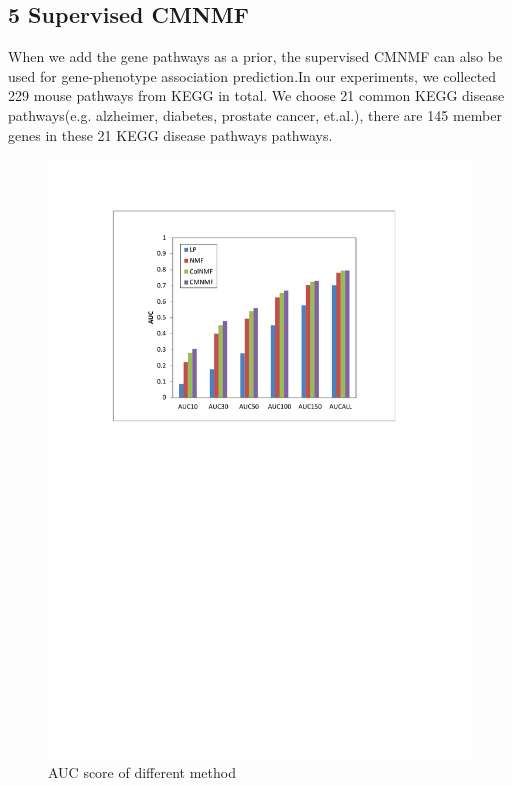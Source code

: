 \documentclass{bmcart}
\begin{document}
\subsection*{\textbf{5 Supervised CMNMF}}
When we add the gene pathways as a prior, the supervised CMNMF can also be used for gene-phenotype association prediction.In our experiments, we collected 229 mouse pathways from KEGG in total. We choose 21 common KEGG disease pathways(e.g. alzheimer, diabetes, prostate cancer, et.al.), there are 145 member genes in these 21 KEGG disease pathways pathways.
\begin{figure}[!h]
  \begin{minipage}[t]{0.7\linewidth}
    \includegraphics[width=\linewidth,origin = l]{DrawPictures/auc_excel.pdf}
  \end{minipage}
  \caption{AUC score of different method} \label{fig:AUC}
\end{figure}
\end{document}
